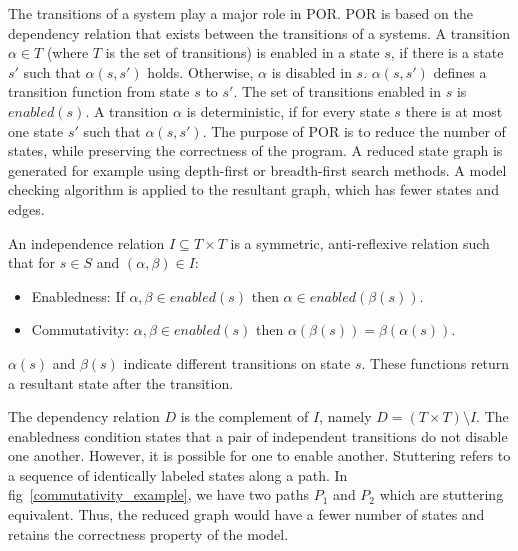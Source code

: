 The transitions of a system play a major role in POR. 
POR is based on the dependency relation that exists between the transitions of a systems. 
A transition $\alpha \in T$ (where $T$ is the set of transitions) is enabled in a state $s$, if there is a state $s'$ such that $\alpha(s, s')$ holds. 
Otherwise, $\alpha$ is disabled in $s$. 
$\alpha(s, s')$ defines a transition function from state $s$ to $s'$. 
The set of transitions enabled in $s$ is $enabled(s)$. 
A transition $\alpha$ is deterministic, if for every state $s$ there is at most one state $s'$ such that $\alpha(s, s')$. 
The purpose of POR is to reduce the number of states, while preserving the correctness of the program. 
A reduced state graph is generated for example using depth-first or breadth-first search methods. 
A model checking algorithm is applied to the resultant graph, which has fewer states and edges. 

An independence relation $I \subseteq T \times T$ is a symmetric, anti-reflexive relation such that for $s \in S$ and $(\alpha, \beta) \in I$:
\begin{itemize}
\item Enabledness: If $\alpha,\beta \in enabled(s)$ then $\alpha \in enabled(\beta(s))$.
\item Commutativity: $\alpha, \beta \in enabled(s)$ then $\alpha(\beta(s)) = \beta(\alpha(s))$.
\end{itemize}
$\alpha(s)$ and $\beta(s)$ indicate different transitions on state $s$. 
These functions return a resultant state after the transition. 

The dependency relation $D$ is the complement of $I$, namely $D = (T \times T) \setminus I$. The enabledness condition states that a pair of independent transitions do not disable one another. 
However, it is possible for one to enable another. 
Stuttering refers to a sequence of identically labeled states along a path. 
In fig~\ref{commutativity_example}, we have two paths $P_1$ and $P_2$ which are stuttering equivalent. 
Thus, the reduced graph would have a fewer number of states and retains the correctness property of the model. 

